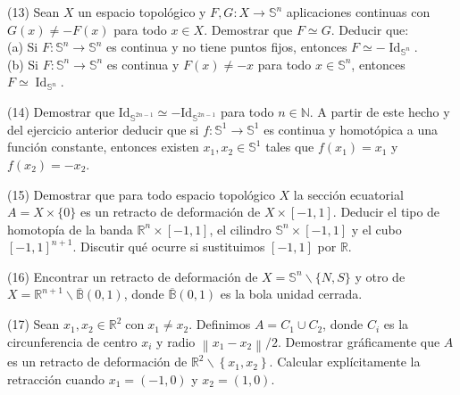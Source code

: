 \documentclass[
  a4paper,
  spanish,
  12pt,
]{scrartcl}
\begin{document}
\newpage

\begin{ejer}
(13) Sean $X$ un espacio topológico y $F, G: X \rightarrow \mathbb{S}^{n}$ aplicaciones continuas con $G(x) \neq-F(x)$ para todo $x \in X$. Demostrar que $F \simeq G$. Deducir que:\\
(a) Si $F: \mathbb{S}^{n} \rightarrow \mathbb{S}^{n}$ es continua y no tiene puntos fijos, entonces $F \simeq-\operatorname{Id}_{\mathbb{S}^{n}}$.\\
(b) Si $F: \mathbb{S}^{n} \rightarrow \mathbb{S}^{n}$ es continua y $F(x) \neq-x$ para todo $x \in \mathbb{S}^{n}$, entonces $F \simeq \operatorname{Id}_{\mathbb{S}^{n}}$.\\
\end{ejer}

\begin{ejer}
(14) Demostrar que $\mathrm{Id}_{\mathbb{S}^{2 n-1}} \simeq-\mathrm{Id}_{\mathbb{S}^{2 n-1}}$ para todo $n \in \mathbb{N}$. A partir de este hecho y del ejercicio anterior deducir que si $f: \mathbb{S}^{1} \rightarrow \mathbb{S}^{1}$ es continua y homotópica a una función constante, entonces existen $x_{1}, x_{2} \in \mathbb{S}^{1}$ tales que $f\left(x_{1}\right)=x_{1}$ y $f\left(x_{2}\right)=-x_{2}$.\\
\end{ejer}

\begin{ejer}
(15) Demostrar que para todo espacio topológico $X$ la sección ecuatorial $A=X \times\{0\}$ es un retracto de deformación de $X \times[-1,1]$. Deducir el tipo de homotopía de la banda $\mathbb{R}^{n} \times[-1,1]$, el cilindro $\mathbb{S}^{n} \times[-1,1]$ y el cubo $[-1,1]^{n+1}$. Discutir qué ocurre si sustituimos $[-1,1]$ por $\mathbb{R}$.\\
\end{ejer}

\begin{ejer}
(16) Encontrar un retracto de deformación de $X=\mathbb{S}^{n} \backslash\{N, S\}$ y otro de $X=\mathbb{R}^{n+1} \backslash \overline{\mathbb{B}}(0,1)$, donde $\overline{\mathbb{B}}(0,1)$ es la bola unidad cerrada.\\
\end{ejer}

\begin{ejer}
(17) Sean $x_{1}, x_{2} \in \mathbb{R}^{2} \operatorname{con} x_{1} \neq x_{2}$. Definimos $A=C_{1} \cup C_{2}$, donde $C_{i}$ es la circunferencia de centro $x_{i}$ y radio $\left\|x_{1}-x_{2}\right\| / 2$. Demostrar gráficamente que $A$ es un retracto de deformación de $\mathbb{R}^{2} \backslash\left\{x_{1}, x_{2}\right\}$. Calcular explícitamente la retracción cuando $x_{1}=(-1,0)$ y $x_{2}=(1,0)$.\\
\end{ejer}
\end{document}
